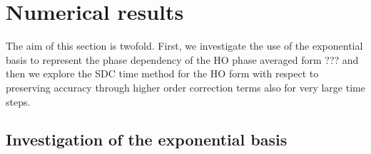 \documentclass[a4,12pt]{article}
\begin{document}
 
 

\section{Numerical results}

The aim of this section is twofold. First, we investigate the use of the exponential basis to represent the phase dependency of the HO phase averaged form ??? and then we explore the SDC time method for the HO form with respect to preserving accuracy through higher order correction terms also for very large time steps.

\subsection{Investigation of the exponential basis}
\end{document}
